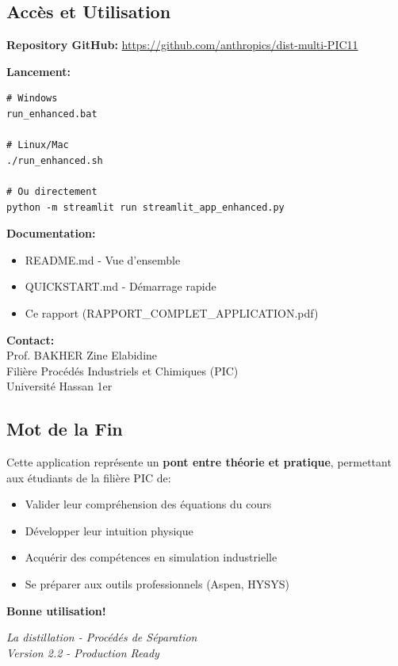 \documentclass[11pt,a4paper]{article}
\begin{document}
\subsection{Accès et Utilisation}

\begin{tcolorbox}[colback=blue!5,colframe=blue!50!black,title=Informations Pratiques]
\textbf{Repository GitHub:} \url{https://github.com/anthropics/dist-multi-PIC11}

\textbf{Lancement:}
\begin{verbatim}
# Windows
run_enhanced.bat

# Linux/Mac
./run_enhanced.sh

# Ou directement
python -m streamlit run streamlit_app_enhanced.py
\end{verbatim}

\textbf{Documentation:}
\begin{itemize}[leftmargin=*]
    \item README.md - Vue d'ensemble
    \item QUICKSTART.md - Démarrage rapide
    \item Ce rapport (RAPPORT\_COMPLET\_APPLICATION.pdf)
\end{itemize}

\textbf{Contact:}\\
Prof. BAKHER Zine Elabidine\\
Filière Procédés Industriels et Chimiques (PIC)\\
Université Hassan 1er
\end{tcolorbox}

\subsection{Mot de la Fin}

Cette application représente un \textbf{pont entre théorie et pratique}, permettant aux étudiants de la filière PIC de:

\begin{itemize}[leftmargin=*]
    \item Valider leur compréhension des équations du cours
    \item Développer leur intuition physique
    \item Acquérir des compétences en simulation industrielle
    \item Se préparer aux outils professionnels (Aspen, HYSYS)
\end{itemize}

\vspace{1cm}

\begin{center}
\textbf{\Large Bonne utilisation!}

\vspace{0.5cm}

\textit{La distillation - Procédés de Séparation}\\
\textit{Version 2.2 - Production Ready}
\end{center}
\end{document}
